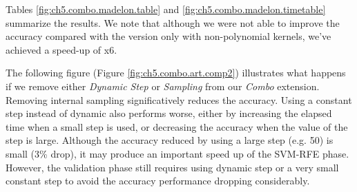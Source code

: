 Tables \ref{fig:ch5.combo.madelon.table} and \ref{fig:ch5.combo.madelon.timetable} summarize the results. We note that although we were not able to improve the accuracy compared with the version only with non-polynomial kernels, we've achieved a speed-up of x6.

The following figure (Figure \ref{fig:ch5.combo.art.comp2}) illustrates what happens if we remove either \emph{Dynamic Step} or \emph{Sampling} from our \emph{Combo} extension. Removing internal sampling significatively reduces the accuracy. Using a constant step instead of dynamic also performs worse, either by increasing the elapsed time when a small step is used, or decreasing the accuracy when the value of the step is large. Although the accuracy reduced by using a large step (e.g. 50) is small (3\% drop), it may produce an im\-por\-tant speed up of the SVM-RFE phase. However, the validation phase still requires using dynamic step or a very small constant step to avoid the accuracy performance drop\-ping considerably. 

